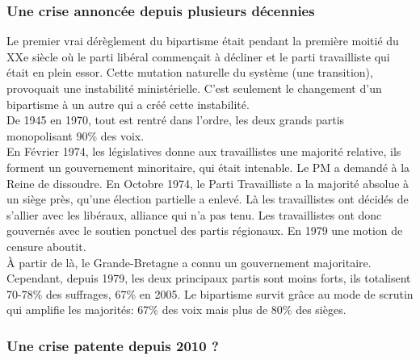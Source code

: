 \documentclass[10pt, a4paper, openany]{book}
\begin{document}
\subsubsection{Une crise annoncée depuis plusieurs décennies}

Le premier vrai dérèglement du bipartisme était pendant la première moitié du XXe siècle où le parti libéral commençait à décliner et le parti travailliste qui était en plein essor. Cette mutation naturelle du système (une transition), provoquait une instabilité ministérielle. C'est seulement le changement d'un bipartisme à un autre qui a créé cette instabilité. \\
De 1945 en 1970, tout est rentré dans l'ordre, les deux grands partis monopolisant 90\% des voix. \\
En Février 1974, les législatives donne aux travaillistes une majorité relative, ils forment un gouvernement minoritaire, qui était intenable. Le PM a demandé à la Reine de dissoudre. En Octobre 1974, le Parti Travailliste a la majorité absolue à un siège près, qu'une élection partielle a enlevé. Là les travaillistes ont décidés de s'allier avec les libéraux, alliance qui n'a pas tenu. Les travaillistes ont donc gouvernés avec le soutien ponctuel des partis régionaux. En 1979 une motion de censure aboutit. \\
À partir de là, le Grande-Bretagne a connu un gouvernement majoritaire. Cependant, depuis 1979, les deux principaux partis sont moins forts, ils totalisent 70-78\% des suffrages, 67\% en 2005. Le bipartisme survit grâce au mode de scrutin qui amplifie les majorités: 67\% des voix mais plus de 80\% des sièges.

\subsubsection{Une crise patente depuis 2010 ?}
\end{document}
